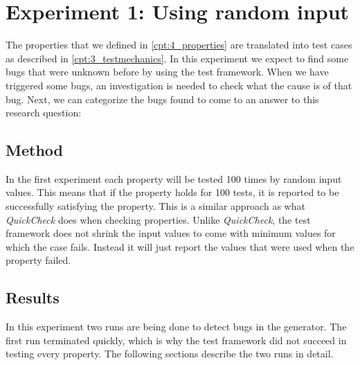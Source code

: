 \chapter{Experiment 1: Using random input}
\label{cpt:experiment1}
The properties that we defined in \autoref{cpt:4_properties} are translated into
test cases as described in \autoref{cpt:3_testmechanics}. In this experiment we
expect to find some bugs that were unknown before by using the test framework.
When we have triggered some bugs, an investigation is needed to check what the
cause is of that bug. Next, we can categorize the bugs found to come to an
answer to this research question:\rqThree{}

\section{Method}
In the first experiment each property will be tested 100 times by random input
values. This means that if the property holds for 100 tests, it is reported to be successfully satisfying the property. This is a similar approach as what \textit{QuickCheck} does when
checking properties. Unlike \textit{QuickCheck}, the test framework does not shrink the input values to come with minimum values for which the case fails. Instead it will just report the values that were used when the property failed.

\section{Results}
In this experiment two runs are being done to detect bugs in the generator. The
first run terminated quickly, which is why the test framework did not succeed in
testing every property. The following sections describe the two runs in detail.

